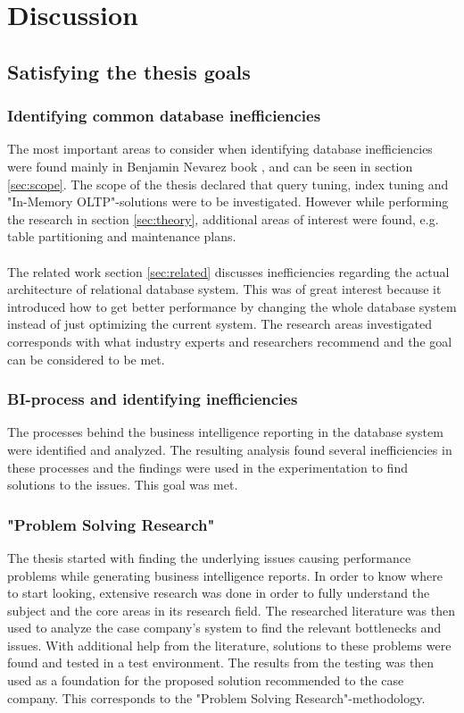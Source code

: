 \documentclass{cslthse-msc}
\begin{document}
\chapter{Discussion}\label{sec:discussion}

\section{Satisfying the thesis goals}

\subsection{Identifying common database inefficiencies}
The most important areas to consider when identifying database inefficiencies were found mainly in Benjamin Nevarez book  \cite{Nevarez}, and can be seen in section \ref{sec:scope}. The scope of the thesis declared that query tuning, index tuning and "In-Memory OLTP"-solutions were to be investigated. However while performing the research in section \ref{sec:theory}, additional areas of interest were found, e.g. table partitioning and maintenance plans. \\\\
The related work section \ref{sec:related} discusses inefficiencies regarding the actual architecture of relational database system. This was of great interest because it introduced how to get better performance by changing the whole database system instead of just optimizing the current system. The research areas investigated corresponds with what industry experts and researchers recommend and the goal can be considered to be met.

\subsection{BI-process and identifying inefficiencies}
The processes behind the business intelligence reporting in the database system were identified and analyzed. The resulting analysis found several inefficiencies in these processes and the findings were used in the experimentation to find solutions to the issues. This goal was met.

\subsection{"Problem Solving Research"}
The thesis started with finding the underlying issues causing performance problems while generating business intelligence reports. In order to know where to start looking, extensive research was done in order to fully understand the subject and the core areas in its research field. The researched literature was then used to analyze the case company's system to find the relevant bottlenecks and issues. With additional help from the literature, solutions to these problems were found and tested in a test environment. The results from the testing was then used as a foundation for the proposed solution recommended to the case company. This corresponds to the "Problem Solving Research"-methodology.  
\end{document}
